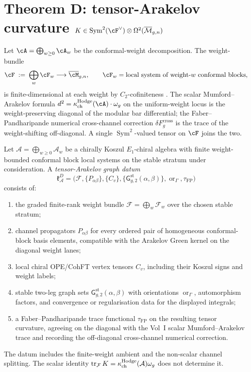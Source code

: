 \section{Theorem D: tensor-Arakelov curvature $K \in \mathrm{Sym}^2(\cF^\vee) \otimes \Omega^2(\overline{\mathcal{M}}_{g,n})$}
\label{sec:theoremD-tensor-arakelov-native}

Let $\cA = \bigoplus_{w \ge 0} \cA_w$ be the conformal-weight
decomposition. The weight-bundle
\[
 \cF \;:=\; \bigoplus_w \cF_w \longrightarrow \overline{\cM}_{g,n},
 \qquad
 \cF_w = \text{local system of weight-$w$ conformal blocks},
\]
is finite-dimensional at each weight by $C_2$-cofiniteness
\cite{Arakawa2012C2}. The scalar Mumford--Arakelov formula
$d^2 = \kappaChHodge(\cA) \cdot \omega_g$ on the uniform-weight
locus is the weight-preserving diagonal of the modular bar
differential; the Faber--Pandharipande numerical cross-channel
correction $\delta F_g^{\mathrm{cross}}$ is the trace of the
weight-shifting off-diagonal.
A single $\operatorname{Sym}^2$-valued tensor on $\cF$ joins the
two.

\begin{definition}
\label{def:tensor-arakelov-graph-datum}
Let \(\mathcal A=\bigoplus_{w\ge0}\mathcal A_w\) be a chirally
Koszul \(E_1\)-chiral algebra with finite weight-bounded conformal
block local systems on the stable stratum under consideration.  A
\emph{tensor-Arakelov graph datum}
\[
\mathfrak k_{\mathcal A}^{D}
=
\bigl(\mathcal F,\{P_{\alpha\beta}\},\{C_v\},
\{\mathsf G^{\mathrm{st}}_{g,2}(\alpha,\beta)\},
\operatorname{or}_{\Gamma},\tau_{\mathrm{FP}}\bigr)
\]
consists of:
\begin{enumerate}[label=\textup{(\roman*)},leftmargin=1.8em]
\item the graded finite-rank weight bundle
\(\mathcal F=\bigoplus_w\mathcal F_w\) over the chosen stable stratum;
\item channel propagators \(P_{\alpha\beta}\) for every ordered pair of
homogeneous conformal-block basis elements, compatible with the
Arakelov Green kernel on the diagonal weight lanes;
\item local chiral OPE/CohFT vertex tensors \(C_v\), including their
Koszul signs and weight labels;
\item stable two-leg graph sets
\(\mathsf G^{\mathrm{st}}_{g,2}(\alpha,\beta)\) with orientations
\(\operatorname{or}_{\Gamma}\), automorphism factors, and convergence
or regularisation data for the displayed integrals;
\item a Faber--Pandharipande trace functional \(\tau_{\mathrm{FP}}\)
on the resulting tensor curvature, agreeing on the diagonal with the
Vol~I scalar Mumford--Arakelov trace and recording the off-diagonal
cross-channel numerical correction.
\end{enumerate}
The datum includes the finite-weight ambient and the non-scalar
channel splitting.  The scalar identity
\(\operatorname{tr}_{\mathcal F}K=\kappa_{\mathrm{ch}}^{\mathrm{Hodge}}(\mathcal A)\omega_g\)
does not determine it.
\end{definition}

